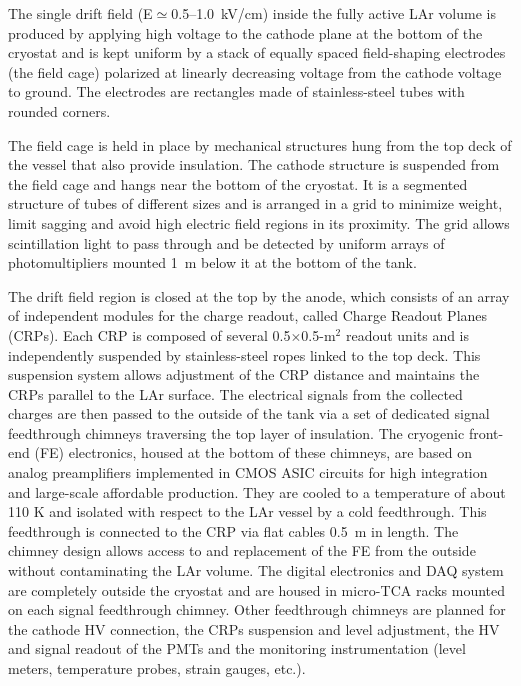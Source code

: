 The single drift field (E${\simeq}$0.5--1.0~kV/cm) inside the fully
active LAr volume is produced by applying high voltage to the cathode
plane at the bottom of the cryostat and is kept uniform by a stack
of equally spaced field-shaping electrodes (the field cage) polarized at
linearly decreasing voltage from the cathode voltage to ground. The
electrodes are %
rectangles made of stainless-steel tubes %
with rounded corners.  

The field cage is held in place by mechanical structures hung from the
top deck of the vessel that also provide insulation.  The cathode
structure is suspended from the field cage and hangs near the 
bottom of the cryostat. %
It is a
segmented structure of tubes of different sizes and is arranged in a grid to 
minimize %
weight, limit sagging and avoid high electric field
regions in its proximity.  The grid allows scintillation light to pass
through and be detected by uniform arrays of photomultipliers mounted
1~m below it at the bottom of the tank.

The drift field region is closed at the top by the anode, which
consists of an array of independent modules for the charge readout,
called Charge Readout Planes (CRPs). Each CRP is composed of several
0.5$\times$0.5-m$^2$ readout units and is independently suspended
by stainless-steel ropes linked to the top deck. This suspension
system allows adjustment of the CRP distance and maintains the CRPs parallel to the LAr surface.  The electrical signals from the collected charges
are then passed to the outside of the tank via a set of dedicated signal
feedthrough chimneys traversing the top layer of insulation. 
The cryogenic front-end (FE) electronics, housed at the bottom of these
chimneys, are based on analog preamplifiers
implemented in CMOS ASIC circuits for high integration and large-scale
affordable production. They are cooled to a temperature of about 110 K and
isolated with respect to the LAr vessel by a cold feedthrough. This
feedthrough is connected to the CRP via flat cables 0.5~m in
length. The chimney design allows access to and replacement of the FE from the
outside without contaminating the LAr volume. The digital electronics
and DAQ system are completely outside the cryostat and are housed in
micro-TCA racks mounted on each signal feedthrough chimney. Other
feedthrough chimneys are planned for the cathode HV connection, the
CRPs suspension and level adjustment, the HV and signal
readout of the PMTs and the monitoring instrumentation (level meters,
temperature probes, strain gauges, etc.).

